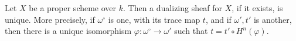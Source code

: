 Let $X$ be a proper scheme over $k$. Then a dualizing sheaf for $X$, if it exists, is unique. More precisely, if $\omega^\circ$ is one, with its trace map $t$, and if $\omega', t'$ is another, then there is a unique isomorphism $\varphi: \omega^\circ \to \omega'$ such that $t = t' \circ H^n(\varphi)$.
